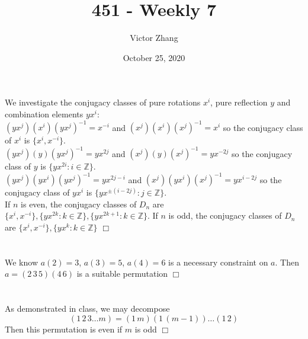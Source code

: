 \documentclass{article}
\title{451 - Weekly 7}
\author{Victor Zhang}
\date{October 25, 2020}
\begin{document}
\maketitle

\section{}
We investigate the conjugacy classes of pure rotations $x^{i}$, pure reflection $y$ and combination elements $yx^{i}$:\\
$(yx^{j})(x^{i})(yx^{j})^{-1} = x^{-i}$ and $(x^{j})(x^{i})(x^{j})^{-1} = x^{i}$ so the conjugacy class of $x^{i}$ is $\{x^{i}, x^{-i}\}$.\\
$(yx^{j})(y)(yx^{j})^{-1} = yx^{2j}$ and $(x^{j})(y)(x^{j})^{-1} = yx^{-2j}$ so the conjugacy class of $y$ is $\{yx^{2i} : i \in \mathbb{Z}\}$.\\
$(yx^{j})(yx^{i})(yx^{j})^{-1} = yx^{2j-i}$ and $(x^{j})(yx^{i})(x^{j})^{-1} = yx^{i-2j}$ so the conjugacy class of $yx^{i}$ is $\{yx^{\pm(i-2j)} : j \in \mathbb{Z}\}$.\\
If $n$ is even, the conjugacy classes of $D_n$ are $\{x^i, x^{-i}\}, \{yx^{2k} : k \in \mathbb{Z}\}, \{yx^{2k+1} : k \in \mathbb{Z}\}$. If $n$ is odd, the conjugacy classes of $D_n$ are $\{x^i, x^{-i}\}, \{yx^{k} : k \in \mathbb{Z}\}$ $\Box$

\section{}
We know $a(2) = 3$, $a(3) = 5$, $a(4) = 6$ is a necessary constraint on $a$. Then $a = (2\, 3\, 5)(4\, 6)$ is a suitable permutation $\Box$

\section{}
As demonstrated in class, we may decompose $$(1\, 2\, 3 \dots m) = (1\, m)(1\, (m-1)) \dots (1\, 2)$$Then this permutation is even if $m$ is odd $\Box$
\end{document}

